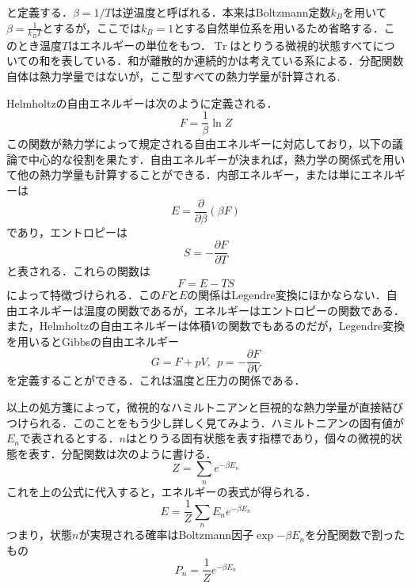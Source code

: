 \documentclass[a4paper,11pt]{jsarticle}
\begin{document}
と定義する．$\beta=1/T$は逆温度と呼ばれる．本来はBoltzmann定数$k_B$を用いて$\beta=\frac{1}{k_B T}$とするが，ここでは$k_B=1$とする自然単位系を用いるため省略する．このとき温度$T$はエネルギーの単位をもつ．$\operatorname{Tr}$はとりうる微視的状態すべてについての和を表している．和が離散的か連続的かは考えている系による．分配関数自体は熱力学量ではないが，ここ型すべての熱力学量が計算される.\par
Helmholtzの自由エネルギーは次のように定義される．
\begin{equation}
  F = \frac{1}{\beta}\ln{Z}
\end{equation}
この関数が熱力学によって規定される自由エネルギーに対応しており，以下の議論で中心的な役割を果たす．自由エネルギーが決まれば，熱力学の関係式を用いて他の熱力学量も計算することができる．内部エネルギー，または単にエネルギーは
\begin{equation}
  E = \frac{\partial}{\partial \beta}(\beta F)
\end{equation}
であり，エントロピーは
\begin{equation}
  S = -\frac{\partial F}{\partial T}
\end{equation}
と表される．これらの関数は
\begin{equation}
  F = E -TS
\end{equation}
によって特徴づけられる．この$F$と$E$の関係はLegendre変換にほかならない．自由エネルギーは温度の関数であるが，エネルギーはエントロピーの関数である．また，Helmholtzの自由エネルギーは体積$V$の関数でもあるのだが，Legendre変換を用いるとGibbsの自由エネルギー
\begin{equation}
  G = F + pV, \ \ p = -\frac{\partial F}{\partial V}
\end{equation}
を定義することができる．これは温度と圧力の関係である．\par
以上の処方箋によって，微視的なハミルトニアンと巨視的な熱力学量が直接結びつけられる．このことをもう少し詳しく見てみよう．ハミルトニアンの固有値が$E_n$で表されるとする．$n$はとりうる固有状態を表す指標であり，個々の微視的状態を表す．分配関数は次のように書ける．
\begin{equation}
  Z = \sum_{n} e^{-\beta E_n}
\end{equation}
これを上の公式に代入すると，エネルギーの表式が得られる．
\begin{equation}
  E = \frac{1}{Z} \sum_{n} E_n e^{-\beta E_n}
\end{equation}
つまり，状態$n$が実現される確率はBoltzmann因子$\exp{-\beta E_n}$を分配関数で割ったもの
\begin{equation}
  P_n = \frac{1}{Z} e^{-\beta E_n}
\end{equation}
\end{document}
